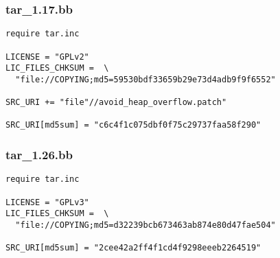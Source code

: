 \begin{frame}[fragile]
  \frametitle{tar\_1.17.bb}
  \begin{block}{}
    \begin{verbatim}
require tar.inc

LICENSE = "GPLv2"
LIC_FILES_CHKSUM =  \
  "file://COPYING;md5=59530bdf33659b29e73d4adb9f9f6552"

SRC_URI += "file"//avoid_heap_overflow.patch"

SRC_URI[md5sum] = "c6c4f1c075dbf0f75c29737faa58f290"
    \end{verbatim}
  \end{block}
\end{frame}

\begin{frame}[fragile]
  \frametitle{tar\_1.26.bb}
  \begin{block}{}
    \begin{verbatim}
require tar.inc

LICENSE = "GPLv3"
LIC_FILES_CHKSUM =  \
  "file://COPYING;md5=d32239bcb673463ab874e80d47fae504"

SRC_URI[md5sum] = "2cee42a2ff4f1cd4f9298eeeb2264519"
    \end{verbatim}
  \end{block}
\end{frame}
